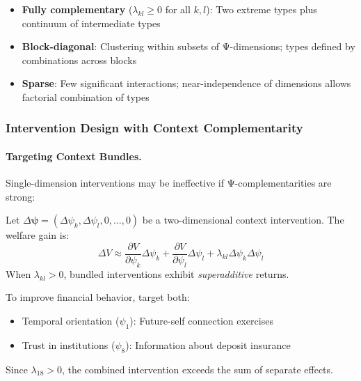 \begin{itemize}
    \item \textbf{Fully complementary} ($\lambda_{kl} \geq 0$ for all $k,l$): Two extreme 
    types plus continuum of intermediate types
    
    \item \textbf{Block-diagonal}: Clustering within subsets of Ψ-dimensions; types 
    defined by combinations across blocks
    
    \item \textbf{Sparse}: Few significant interactions; near-independence of dimensions 
    allows factorial combination of types
\end{itemize}

\subsubsection{Intervention Design with Context Complementarity}

\paragraph{Targeting Context Bundles.}

Single-dimension interventions may be ineffective if Ψ-complementarities are strong:

\begin{proposition}
\label{prop:bundle}
Let $\Delta \boldsymbol{\psi} = (\Delta \psi_k, \Delta \psi_l, 0, \ldots, 0)$ be a 
two-dimensional context intervention. The welfare gain is:
\begin{equation}
\Delta V \approx \frac{\partial V}{\partial \psi_k} \Delta \psi_k + 
\frac{\partial V}{\partial \psi_l} \Delta \psi_l + 
\lambda_{kl} \Delta \psi_k \Delta \psi_l
\end{equation}
When $\lambda_{kl} > 0$, bundled interventions exhibit \emph{superadditive} returns.
\end{proposition}

\begin{example}
To improve financial behavior, target both:
\begin{itemize}
    \item Temporal orientation ($\psi_1$): Future-self connection exercises
    \item Trust in institutions ($\psi_8$): Information about deposit insurance
\end{itemize}
Since $\lambda_{18} > 0$, the combined intervention exceeds the sum of separate effects.
\end{example}

